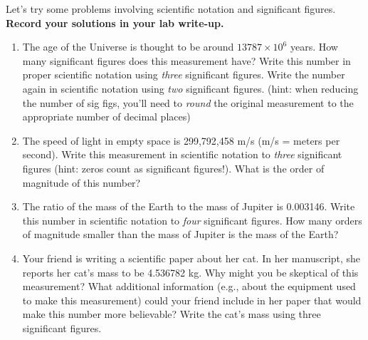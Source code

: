 \documentclass[11pt]{article}
\begin{document}
Let's try some problems involving scientific notation and significant figures. \textbf{Record your solutions in your lab write-up.}
\begin{enumerate}
    \item The age of the Universe is thought to be around $13787 \times 10^{6}$ years. How many significant figures does this measurement have? Write this number in proper scientific notation using \emph{three} significant figures. Write the number again in scientific notation using \emph{two} significant figures. (hint: when reducing the number of sig figs, you'll need to \emph{round} the original measurement to the appropriate number of decimal places) 
    
    \item The speed of light in empty space is 299,792,458 m/s (m/s = meters per second). Write this measurement in scientific notation to \emph{three} significant figures (hint: zeros count as significant figures!). What is the order of magnitude of this number?
    
    \item The ratio of the mass of the Earth to the mass of Jupiter is 0.003146. Write this number in scientific notation to \emph{four} significant figures. How many orders of magnitude smaller than the mass of Jupiter is the mass of the Earth?
    
    \item Your friend is writing a scientific paper about her cat. In her manuscript, she reports her cat's mass to be 4.536782 kg. Why might you be skeptical of this measurement? What additional information (e.g., about the equipment used to make this measurement) could your friend include in her paper that would make this number more believable? Write the cat's mass using three significant figures.
\end{enumerate}

\bigskip
\end{document}
